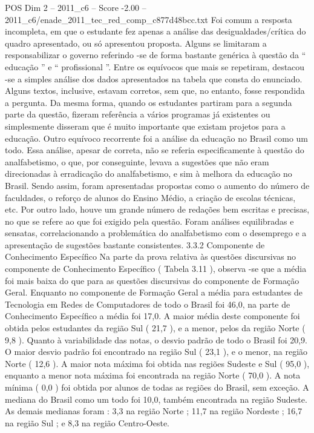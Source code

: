 \begin{textsample}{POS Dim 2 – 2011\_c6 – Score -2.00 – 2011\_c6/enade\_2011\_tec\_red\_comp\_c877d48bcc.txt}
Foi comum a resposta incompleta, em que o estudante fez apenas a análise das desigualdades/crítica do quadro apresentado, ou só apresentou proposta.
Alguns se limitaram a responsabilizar o governo referindo -se de forma bastante genérica à questão da “ educação ” e “ profissional ”.
Entre os equívocos que mais se repetiram, destacou -se a simples análise dos dados apresentados na tabela que consta do enunciado.
Alguns textos, inclusive, estavam corretos, sem que, no entanto, fosse respondida a pergunta.
Da mesma forma, quando os estudantes partiram para a segunda parte da questão, fizeram referência a vários programas já existentes ou simplesmente disseram que é muito importante que existam projetos para a educação.
Outro equívoco recorrente foi a análise da educação no Brasil como um todo.
Essa análise, apesar de correta, não se referia especificamente à questão do analfabetismo, o que, por conseguinte, levava a sugestões que não eram direcionadas à erradicação do analfabetismo, e sim à melhora da educação no Brasil.
Sendo assim, foram apresentadas propostas como o aumento do número de faculdades, o reforço de alunos do Ensino Médio, a criação de escolas técnicas, etc.
Por outro lado, houve um grande número de redações bem escritas e precisas, no que se refere ao que foi exigido pela questão.
Foram análises equilibradas e sensatas, correlacionando a problemática do analfabetismo com o desemprego e a apresentação de sugestões bastante consistentes. 3.3.2 Componente de Conhecimento Específico Na parte da prova relativa às questões discursivas no componente de Conhecimento Específico ( Tabela 3.11 ), observa -se que a média foi mais baixa do que para as questões discursivas do componente de Formação Geral.
Enquanto no componente de Formação Geral a média para estudantes de Tecnologia em Redes de Computadores de todo o Brasil foi 46,0, na parte de Conhecimento Específico a média foi 17,0.
A maior média deste componente foi obtida pelos estudantes da região Sul ( 21,7 ), e a menor, pelos da região Norte ( 9,8 ).
Quanto à variabilidade das notas, o desvio padrão de todo o Brasil foi 20,9.
O maior desvio padrão foi encontrado na região Sul ( 23,1 ), e o menor, na região Norte ( 12,6 ).
A maior nota máxima foi obtida nas regiões Sudeste e Sul ( 95,0 ), enquanto a menor nota máxima foi encontrada na região Norte ( 70,0 ).
A nota mínima ( 0,0 ) foi obtida por alunos de todas as regiões do Brasil, sem exceção.
A mediana do Brasil como um todo foi 10,0, também encontrada na região Sudeste.
As demais medianas foram : 3,3 na região Norte ; 11,7 na região Nordeste ; 16,7 na região Sul ; e 8,3 na região Centro-Oeste.

\end{textsample}
